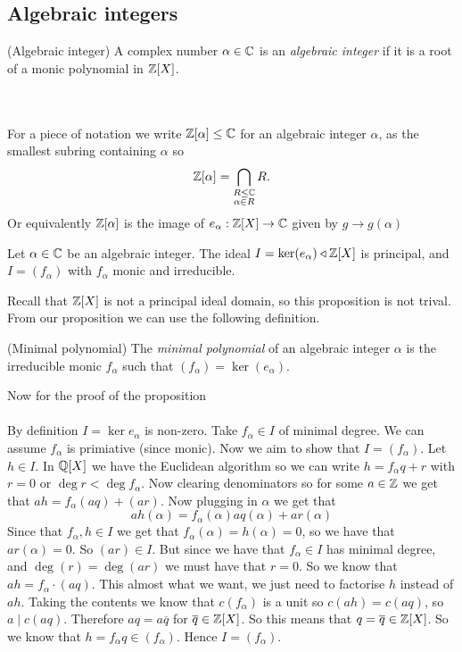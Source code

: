 \documentclass{article}
\newcommand{\nrm}{\triangleleft}
\begin{document}
\begin{itemize}
\subsection{Algebraic integers}
\begin{definition}
	(Algebraic integer) A complex number $ \alpha\in \mathbb{C} $ is an \textit{algebraic integer} if it is a root of a monic polynomial in $ \mathbb{Z}[X] $.
\end{definition}
\\\\
For a piece of notation we write $ \mathbb{Z}[\alpha]\le \mathbb{C} $ for an algebraic integer $ \alpha $, as the smallest subring containing $ \alpha $ so
\[
	\mathbb{Z}[\alpha]=\bigcap_{\substack{R\le \mathbb{C} \\ \alpha\in R}}R.
\]
Or equivalently $ \mathbb{Z}[\alpha] $ is the image of $ e_\alpha:\mathbb{Z}[X]\to \mathbb{C} $ given by $ g\to g(\alpha) $
\begin{proposition}
	Let $ \alpha\in \mathbb{C} $ be an algebraic integer. The ideal $ I=\ker (e_\alpha)\nrm \Z[X] $ is principal, and $ I=(f_\alpha) $ with $ f_\alpha $ monic and irreducible.
\end{proposition}
Recall that $ \mathbb{Z}[X] $ is not a principal ideal domain, so this proposition is not trival.\\ From our proposition we can use the following definition.
\begin{definition}
	(Minimal polynomial) The \textit{minimal polynomial} of an algebraic integer $ \alpha $ is the irreducible monic $ f_\alpha $ such that $ (f_\alpha)=\ker (e_\alpha) $.
\end{definition}
Now for the proof of the proposition\\\\
\pf By definition $ I=\ker e_\alpha $ is non-zero. Take $ f_\alpha\in I $ of minimal degree. We can assume $ f_\alpha $ is primiative (since monic). Now we aim to show that $ I=(f_\alpha) $. Let $ h\in I $. In $ \mathbb{Q}[X] $ we have the Euclidean algorithm so we can write $ h=f_\alpha q+r $ with $ r=0 $ or $ \deg r<\deg f_\alpha $. Now clearing denominators so for some $ a\in \mathbb{Z} $ we get that $ ah=f_\alpha(aq)+(ar) $. Now plugging in $ \alpha $ we get that
\[
  ah(\alpha)=f_\alpha(\alpha)aq(\alpha)+ar(\alpha)
\]
Since that $ f_\alpha,h\in I $ we get that $ f_\alpha(\alpha)=h(\alpha)=0 $, so we have that $ ar(\alpha)=0 $. So $ (ar)\in I $. But since we have that $ f_\alpha\in I $ has minimal degree, and $ \deg(r)=\deg(ar) $ we must have that $ r=0 $. So we know that $ ah=f_\alpha\cdot (aq) $. This almost what we want, we just need to factorise $ h $ instead of $ ah $. Taking the contents we know that $ c(f_\alpha) $ is a unit so $ c(ah)=c(aq) $, so $ a\mid c(aq) $. Therefore $ aq=a\overline q $ for $ \overline q\in \mathbb{Z}[X] $. So this means that $ q=\overline q\in \mathbb{Z}[X] $. So we know that $ h=f_\alpha q\in (f_\alpha) $. Hence $ I=(f_\alpha) $.\\\\

\end{itemize}
\end{document}
